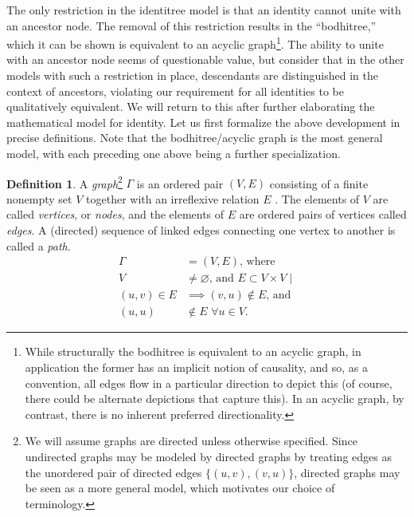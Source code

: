 \documentclass[pra,twocolumn,groupedaddress,10pt]{revtex4}
\theoremstyle{definition}
\newtheorem{defn}{Definition}[section]
\begin{document}
The only restriction in the identitree model is that an identity cannot unite with an ancestor node. The removal of this restriction results in the ``bodhitree,'' which it can be shown is equivalent to an acyclic graph\footnote{While structurally the bodhitree is equivalent to an acyclic graph, in application the former has an implicit notion of causality, and so, as a convention, all edges flow in a particular direction to depict this (of course, there could be alternate depictions that capture this). In an acyclic graph, by contrast, there is no inherent preferred directionality.}. The ability to unite with an ancestor node seems of questionable value, but consider that in the other models with such a restriction in place, descendants are distinguished in the context of ancestors, violating our requirement for all identities to be qualitatively equivalent. We will return to this after further elaborating the mathematical model for identity. Let us first formalize the above development in precise definitions. Note that the bodhitree/acyclic graph is the most general model, with each preceding one above being a further specialization.

\begin{defn}
	A \emph{graph}\footnote{We will assume graphs are directed unless otherwise specified. Since undirected graphs may be modeled by directed graphs by treating edges as the unordered pair of directed edges $\{(u,v),(v,u)\}$\cite{chartrand}, directed graphs may be seen as a more general model, which motivates our choice of terminology.} $\Gamma$ is an ordered pair $(V, E)$ consisting of a finite nonempty set $V$ together with an irreflexive relation $E$ \cite{chartrand}. The elements of $V$ are called \emph{vertices}, or \emph{nodes}, and the elements of $E$ are ordered pairs of vertices called \emph{edges}. A (directed) sequence of linked edges connecting one vertex to another is called a \emph{path}.
	\begin{equation}
		\begin{split}
			\Gamma &= (V, E) \text{, where} \\
			V &\neq \varnothing \text{, and } E \subset V \times V \mid \\
			(u,v) \in E &\implies (v,u) \notin E \text{, and} \\
			(u,u) &\notin E \,\, \forall u \in V .
		\end{split}
		\nonumber
	\end{equation}
\end{defn}
\end{document}
